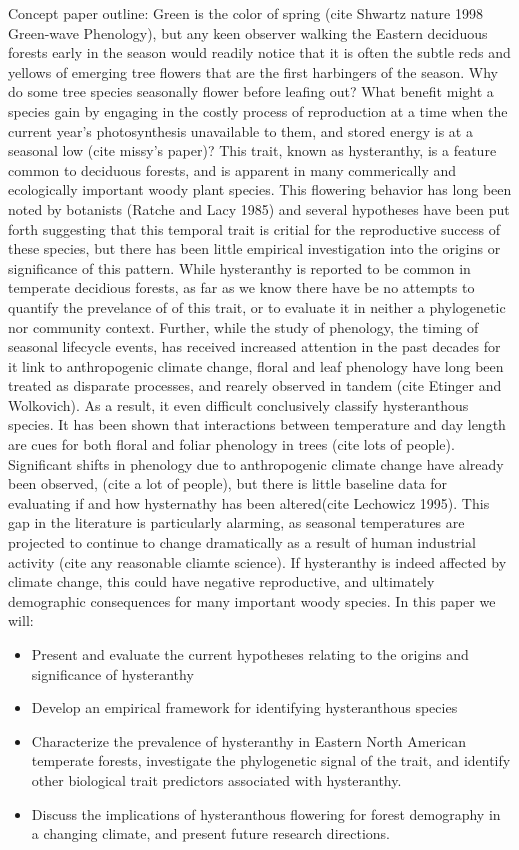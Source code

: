 \documentclass{article}\usepackage[]{graphicx}\usepackage[]{color}
\begin{document}
Concept paper outline:
Green is the color of spring (cite Shwartz nature 1998 Green-wave Phenology), but any keen observer walking the Eastern deciduous forests early in the season would readily notice that it is often the subtle reds and yellows of emerging tree flowers that are the first harbingers of the season. Why do some tree species seasonally flower before leafing out? What benefit might a species gain by engaging in the costly process of reproduction at a time when the current year's photosynthesis unavailable to them, and stored energy is at a seasonal low (cite missy's paper)? This trait, known as hysteranthy, is a feature common to deciduous forests, and is apparent in many commerically and ecologically important woody plant species. This flowering behavior has long been noted by botanists (Ratche and Lacy 1985) and several hypotheses  have been put forth suggesting that this temporal trait is critial for the reproductive success of these species, but there has been little empirical investigation into the origins or significance of this pattern. While hysteranthy is reported to be common in temperate decidious forests, as far as we know there have be no attempts to quantify the prevelance of of this trait, or to evaluate it in neither a phylogenetic nor community context. Further, while the study of phenology, the timing of seasonal lifecycle events, has received increased attention in the past decades for it link to anthropogenic climate change, floral and leaf phenology have long been treated as disparate processes, and rearely observed in tandem (cite Etinger and Wolkovich). As a result, it even difficult conclusively classify hysteranthous species. It has been shown that interactions between temperature and day length are cues for both floral and foliar phenology in trees (cite lots of people). Significant shifts in phenology due to anthropogenic climate change have already been observed, (cite a lot of people), but there is little baseline data for evaluating if and how hysternathy has been altered(cite Lechowicz 1995). This gap in the literature is particularly alarming, as seasonal temperatures are projected to continue to change dramatically as a result of human industrial activity (cite any reasonable cliamte science). If hysteranthy is indeed affected by climate change, this could have negative reproductive, and ultimately demographic consequences for many important woody species. In this paper we will:
\begin{itemize}
\item Present and evaluate the current hypotheses relating to the origins and significance of hysteranthy 
\item Develop an empirical framework for identifying hysteranthous species
\item Characterize the prevalence of hysteranthy in Eastern North American temperate forests, investigate the phylogenetic signal of the trait, and identify other biological trait predictors associated with hysteranthy.
\item  Discuss the implications of hysteranthous flowering for forest demography in a changing climate, and present future research directions.
\end{itemize}
\end{document}
